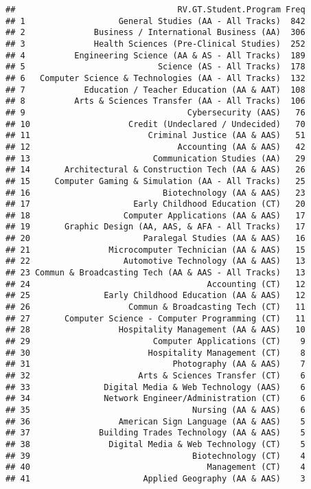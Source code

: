 \documentclass[]{article}
\begin{document}
\begin{verbatim}
##                                 RV.GT.Student.Program Freq
## 1                   General Studies (AA - All Tracks)  842
## 2              Business / International Business (AA)  306
## 3              Health Sciences (Pre-Clinical Studies)  252
## 4          Engineering Science (AA & AS - All Tracks)  189
## 5                           Science (AS - All Tracks)  178
## 6   Computer Science & Technologies (AA - All Tracks)  132
## 7            Education / Teacher Education (AA & AAT)  108
## 8          Arts & Sciences Transfer (AA - All Tracks)  106
## 9                                 Cybersecurity (AAS)   76
## 10                    Credit (Undeclared / Undecided)   70
## 11                        Criminal Justice (AA & AAS)   51
## 12                              Accounting (AA & AAS)   42
## 13                         Communication Studies (AA)   29
## 14       Architectural & Construction Tech (AA & AAS)   26
## 15     Computer Gaming & Simulation (AA - All Tracks)   25
## 16                           Biotechnology (AA & AAS)   23
## 17                     Early Childhood Education (CT)   20
## 18                   Computer Applications (AA & AAS)   17
## 19       Graphic Design (AA, AAS, & AFA - All Tracks)   17
## 20                       Paralegal Studies (AA & AAS)   16
## 21                Microcomputer Technician (AA & AAS)   15
## 22                   Automotive Technology (AA & AAS)   13
## 23 Commun & Broadcasting Tech (AA & AAS - All Tracks)   13
## 24                                    Accounting (CT)   12
## 25               Early Childhood Education (AA & AAS)   12
## 26                    Commun & Broadcasting Tech (CT)   11
## 27       Computer Science - Computer Programming (CT)   11
## 28                  Hospitality Management (AA & AAS)   10
## 29                         Computer Applications (CT)    9
## 30                        Hospitality Management (CT)    8
## 31                             Photography (AA & AAS)    7
## 32                      Arts & Sciences Transfer (CT)    6
## 33               Digital Media & Web Technology (AAS)    6
## 34               Network Engineer/Administration (CT)    6
## 35                                 Nursing (AA & AAS)    6
## 36                  American Sign Language (AA & AAS)    5
## 37              Building Trades Technology (AA & AAS)    5
## 38                Digital Media & Web Technology (CT)    5
## 39                                 Biotechnology (CT)    4
## 40                                    Management (CT)    4
## 41                       Applied Geography (AA & AAS)    3

\end{verbatim}
\end{document}
